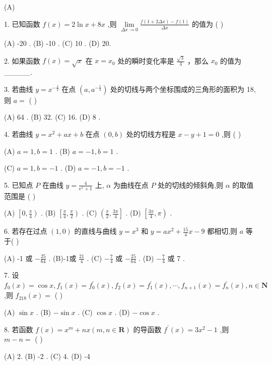 \documentclass[10pt]{article}
\begin{document}
(A)

1. 已知函数 \(f\left( x\right)  = 2\ln x + {8x}\) ,则 \(\mathop{\lim }\limits_{{{\Delta x} \rightarrow  0}}\frac{f\left( {1 + {2\Delta x}}\right)  - f\left( 1\right) }{\Delta x}\) 的值为 ( )

(A) -20 . (B) -10 . (C) 10 . (D) 20.

2. 如果函数 \(f\left( x\right)  = \sqrt{x}\) 在 \(x = {x}_{0}\) 处的瞬时变化率是 \(\frac{\sqrt{3}}{3}\) ，那么 \({x}_{0}\) 的值为\_\_\_\_\_.

3. 若曲线 \(y = {x}^{-\frac{1}{2}}\) 在点 \(\left( {a,{a}^{-\frac{1}{2}}}\right)\) 处的切线与两个坐标围成的三角形的面积为 18,则 \(a =\) (   )

(A) 64 . (B) 32. (C) 16. (D) 8 .

4. 若曲线 \(y = {x}^{2} + {ax} + b\) 在点 \(\left( {0,b}\right)\) 处的切线方程是 \(x - y + 1 = 0\) ,则 ( )

(A) \(a = 1,b = 1\) . (B) \(a =  - 1,b = 1\) .

(C) \(a = 1,b =  - 1\) . (D) \(a =  - 1,b =  - 1\) .

5. 已知点 \(P\) 在曲线 \(y = \frac{4}{{\mathrm{e}}^{x} + 1}\) 上, \(\alpha\) 为曲线在点 \(P\) 处的切线的倾斜角,则 \(\alpha\) 的取值范围是 ( )

(A) \(\left\lbrack  {0,\frac{\pi }{4}}\right)\) . (B) \(\left\lbrack  {\frac{\pi }{4},\frac{\pi }{2}}\right)\) . (C) \(\left( {\frac{\pi }{2},\frac{3\pi }{4}}\right\rbrack\) . (D) \(\left\lbrack  {\frac{3\pi }{4},\pi }\right)\) .

6. 若存在过点 \(\left( {1,0}\right)\) 的直线与曲线 \(y = {x}^{3}\) 和 \(y = a{x}^{2} + \frac{15}{4}x - 9\) 都相切,则 \(a\) 等于( )

(A) -1 或 \(- \frac{25}{64}\) . (B)-1或 \(\frac{21}{4}\) . (C) \(- \frac{7}{4}\) 或 \(- \frac{25}{64}\) . (D) \(- \frac{7}{4}\) 或 7 .

7. 设 \({f}_{0}\left( x\right)  = \cos x,{f}_{1}\left( x\right)  = {f}_{0}^{\prime }\left( x\right) ,{f}_{2}\left( x\right)  = {f}_{1}^{\prime }\left( x\right) ,\cdots ,{f}_{n + 1}\left( x\right)  = {f}_{n}^{\prime }\left( x\right) ,n \in  \mathbf{N}\) ,则 \({f}_{218}\left( x\right)  =\) (   )

(A) \(\sin x\) . (B) \(- \sin x\) . (C) \(\cos x\) . (D) \(- \cos x\) .

8. 若函数 \(f\left( x\right)  = {x}^{m} + {nx}\left( {m,n \in  \mathbf{R}}\right)\) 的导函数 \({f}^{\prime }\left( x\right)  = 3{x}^{2} - 1\) ,则 \(m - n =\) (   )

(A) 2. (B) -2 . (C) 4. (D) -4
\end{document}
